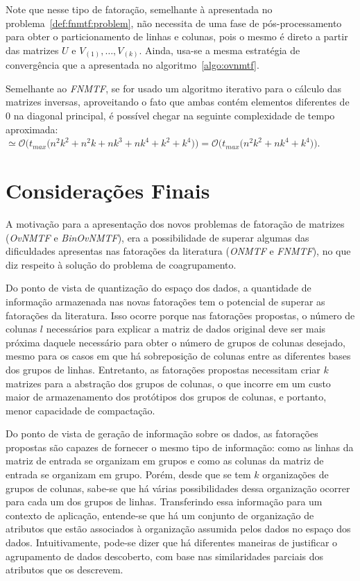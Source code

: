 \documentclass[
    12pt,                %
    oneside,            %
    a4paper,            %
    english,            %
    brazil                %
    ]{abntex2ppgsi}
\begin{document}
Note que nesse tipo de fatoração, semelhante à apresentada no problema~\ref{def:fnmtf:problem}, não necessita de uma fase de pós-processamento para obter o particionamento de linhas e colunas, pois o mesmo é direto a partir das matrizes $U$ e $V_{(1)}, \dots, V_{(k)}$.
Ainda, usa-se a mesma estratégia de convergência que a apresentada no algoritmo~\ref{algo:ovnmtf}.

Semelhante ao \textit{FNMTF}, se for usado um algoritmo iterativo para o cálculo das matrizes inversas, aproveitando o fato que ambas contém elementos diferentes de $0$ na diagonal principal, é possível chegar na seguinte complexidade de tempo aproximada: $\simeq \mathcal{O}\Big( t_{max} \big( n^2k^2 + n^2k + nk^3 + nk^4 + k^2 + k^4 \big) \Big) = \mathcal{O}\Big( t_{max} \big( n^2k^2 + nk^4 + k^4 \big) \Big)$.

\section{Considerações Finais}

A motivação para a apresentação dos novos problemas de fatoração de matrizes (\textit{OvNMTF} e \textit{BinOvNMTF}), era a possibilidade de superar algumas das dificuldades apresentas nas fatorações da literatura (\textit{ONMTF} e \textit{FNMTF}), no que diz respeito à solução do problema de coagrupamento.

Do ponto de vista de quantização do espaço dos dados, a quantidade de informação armazenada nas novas fatorações tem o potencial de superar as fatorações da literatura.
Isso ocorre porque nas fatorações propostas, o número de colunas $l$ necessários para explicar a matriz de dados original deve ser mais próxima daquele necessário para obter o número de grupos de colunas desejado, mesmo para os casos em que há sobreposição de colunas entre as diferentes bases dos grupos de linhas.
Entretanto, as fatorações propostas necessitam criar $k$ matrizes para a abstração dos grupos de colunas, o que incorre em um custo maior de armazenamento dos protótipos dos grupos de colunas, e portanto, menor capacidade de compactação.

Do ponto de vista de geração de informação sobre os dados, as fatorações propostas são capazes de fornecer o mesmo tipo de informação: como as linhas da matriz de entrada se organizam em grupos e como as colunas da matriz de entrada se organizam em grupo.
Porém, desde que se tem $k$ organizações de grupos de colunas, sabe-se que há várias possibilidades dessa organização ocorrer para cada um dos grupos de linhas.
Transferindo essa informação para um contexto de aplicação, entende-se que há um conjunto de organização de atributos que estão associados à organização assumida pelos dados no espaço dos dados.
Intuitivamente, pode-se dizer que há diferentes maneiras de justificar o agrupamento de dados descoberto, com base nas similaridades parciais dos atributos que os descrevem.
\end{document}
